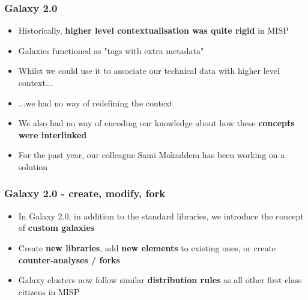 \begin{frame}
\frametitle{Galaxy 2.0}
\begin{itemize}
	\item Historically, {\bf higher level contextualisation was quite rigid} in MISP
        \item Galaxies functioned as "tags with extra metadata"
        \item Whilst we could use it to associate our technical data with higher level context...
        \item ...we had no way of redefining the context
        \item We also had no way of encoding our knowledge about how these {\bf concepts were interlinked}
        \item For the past year, our colleague Sami Mokaddem has been working on a solution
\end{itemize}
\end{frame}

\begin{frame}
\frametitle{Galaxy 2.0 - create, modify, fork}
\begin{itemize}
	\item In Galaxy 2.0, in addition to the standard libraries, we introduce the concept of {\bf custom galaxies}
        \item Create {\bf new libraries}, add {\bf new elements} to existing ones, or create {\bf counter-analyses / forks}
        \item Galaxy clusters now follow similar {\bf distribution rules} as all other first class citizens in MISP
\end{itemize}
\noindent{}
\end{frame}


